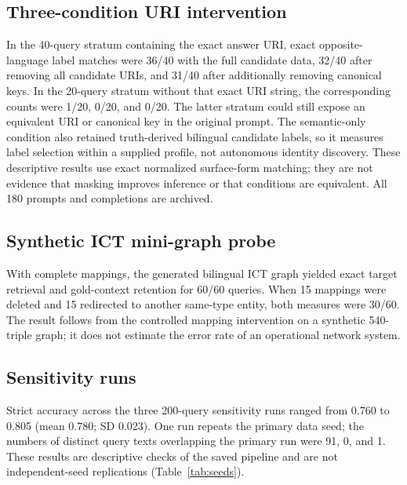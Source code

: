 \documentclass[a4paper,fleqn]{cas-dc}
\begin{document}
\begin{table}[t]
\centering\small

\caption{Primary results stratified by the exact answer-bearing URI string in the reconstructed prompt. URI absence does not imply absence of counterpart identifiers or other identity cues. Intervals are two-sided 95\% exact binomial intervals for strict accuracy. Two-hop work URIs are traversal targets, so exposure is not defined for that family.}
\label{tab:probe}
\end{table}

\subsection{Three-condition URI intervention}
In the 40-query stratum containing the exact answer URI, exact opposite-language label matches were 36/40 with the full candidate data, 32/40 after removing all candidate URIs, and 31/40 after additionally removing canonical keys. In the 20-query stratum without that exact URI string, the corresponding counts were 1/20, 0/20, and 0/20. The latter stratum could still expose an equivalent URI or canonical key in the original prompt. The semantic-only condition also retained truth-derived bilingual candidate labels, so it measures label selection within a supplied profile, not autonomous identity discovery. These descriptive results use exact normalized surface-form matching; they are not evidence that masking improves inference or that conditions are equivalent. All 180 prompts and completions are archived.

\subsection{Synthetic ICT mini-graph probe}
With complete mappings, the generated bilingual ICT graph yielded exact target retrieval and gold-context retention for 60/60 queries. When 15 mappings were deleted and 15 redirected to another same-type entity, both measures were 30/60. The result follows from the controlled mapping intervention on a synthetic 540-triple graph; it does not estimate the error rate of an operational network system.

\subsection{Sensitivity runs}
Strict accuracy across the three 200-query sensitivity runs ranged from 0.760 to 0.805 (mean 0.780; SD 0.023). One run repeats the primary data seed; the numbers of distinct query texts overlapping the primary run were 91, 0, and 1. These results are descriptive checks of the saved pipeline and are not independent-seed replications (Table~\ref{tab:seeds}).
\end{document}
